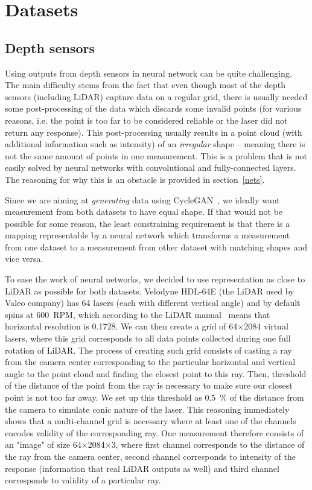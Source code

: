 \chapter{Datasets} \label{dataset}

\section{Depth sensors}
Using outputs from depth sensors in neural network can be quite challenging. The main difficulty stems from the fact that even though most of the depth sensors (including LiDAR) capture data on a regular grid, there is usually needed some post-processing of the data which discards some invalid points (for various reasons, i.e. the point is too far to be considered reliable or the laser did not return any response). This post-processing usually results in a point cloud (with additional information such as intensity) of an {\em irregular} shape -- meaning there is not the same amount of points in one measurement. This is a problem that is not easily solved by neural networks with convolutional and fully-connected layers. The reasoning for why this is an obstacle is provided in section~\ref{nets}.

Since we are aiming at {\em generating} data using CycleGAN~\cite{cyclegan}, we ideally want measurement from both datasets to have equal shape. If that would not be possible for some reason, the least constraining requirement is that there is a mapping representable by a neural network which transforms a measurement from one dataset to a measurement from other dataset with matching shapes and vice versa.

To ease the work of neural networks, we decided to use representation as close to LiDAR as possible for both datasets. Velodyne HDL-64E (the LiDAR used by Valeo company) has 64 lasers (each with different vertical angle) and by default spins at 600~RPM, which according to the LiDAR manual~\cite{velomanual} means that horizontal resolution is 0.1728\degree{}. We can then create a grid of 64$\times$2084 virtual lasers, where this grid corresponds to all data points collected during one full rotation of LiDAR. The process of creating such grid consists of casting a ray from the camera center corresponding to the particular horizontal and vertical angle to the point cloud and finding the closest point to this ray. Then, threshold of the distance of the point from the ray is necessary to make sure our closest point is not too far away. We set up this threshold as 0.5~\% of the distance from the camera to simulate conic nature of the laser. This reasoning immediately shows that a multi-channel grid is necessary where at least one of the channels encodes validity of the corresponding ray. One measurement therefore consists of an "image" of size 64$\times$2084$\times$3, where first channel corresponds to the distance of the ray from the camera center, second channel corresponds to intensity of the response (information that real LiDAR outputs as well) and third channel corresponds to validity of a particular ray.

